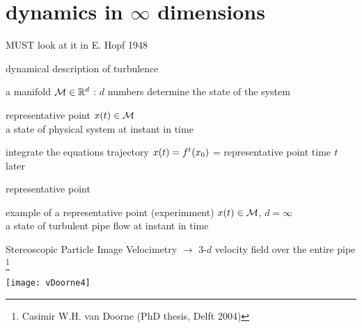\section[dynamics in $\infty$ dimensions]
{dynamics in $\infty$ dimensions}

\begin{frame}{{\Large MUST} look at it in}
\bigskip
\hfill
{\Huge \statesp}
\vfill
E. Hopf 1948
\end{frame}

\begin{frame}{dynamical description of turbulence}

\begin{block}{\statesp}
a manifold $\mathcal{M} \in \mathbb{R}^{d}$ :
$d$ numbers determine the state of the system
\end{block}

\bigskip

\begin{block}{representative point }
$x(t) \in \mathcal{M}$
\\
a state of physical system at instant in time
\end{block}

\bigskip

\begin{block}{integrate the equations}
trajectory $x(t) = {f^{t}({x_0})}$ =
representative point time $t$ later
\end{block}
\end{frame}

\begin{frame}{representative point}
\begin{block}{example of a representative point (experimment)}
$x(t) \in \mathcal{M}$, $d= \infty$ \\
a state of turbulent pipe flow at instant in time
\end{block}

\bigskip

Stereoscopic Particle Image Velocimetry $\to$
3-$d$ velocity field over the entire pipe%
\footnote{\footnotesize
Casimir W.H. van Doorne
(PhD thesis, Delft  2004)
}

\bigskip

\begin{center}
\texttt{[image: vDoorne4]}
\end{center}
\end{frame}

